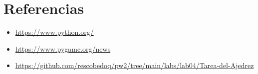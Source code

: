 \documentclass{article}
\begin{document}
	
  \newpage
  \section{Referencias}
  \begin{itemize}
    \item \url{https://www.python.org/}
    \item \url{https://www.pygame.org/news}
    \item \url{https://github.com/rescobedoq/pw2/tree/main/labs/lab04/Tarea-del-Ajedrez}
  \end{itemize}

%
%
%
			
\end{document}
